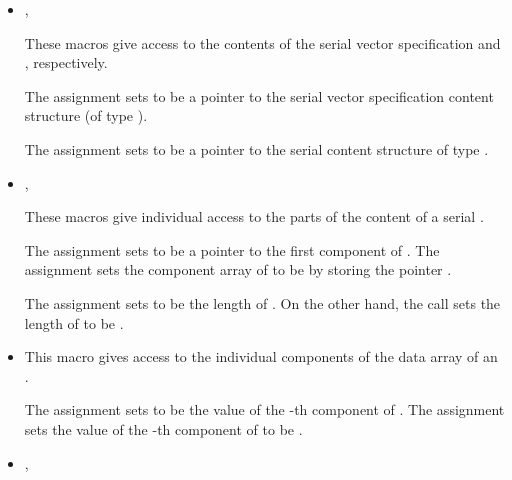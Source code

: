 \begin{itemize}

\item {}, 

      These macros give access to the contents of the serial 
      vector specification and , respectively.           
                                                               
      The assignment  sets       
       to be a pointer to the serial vector
      specification content structure (of type ).

      The assignment  sets       
       to be a pointer to the serial  content    
      structure of type .

\item {}, 

      These macros give individual access to the parts of    
      the content of a serial .                        
                                                               
      The assignment  sets  to be     
      a pointer to the first component of . The assignment    
       sets the component array of  to     
      be  by storing the pointer .                   
                                                               
      The assignment  sets  to be     
      the length of . On the other hand, the call  
      sets the length of  to be .

\item {}

      This macro gives access to the individual components of the data
      array of an .

      The assignment  sets  to be the value of 
      the -th component of . The assignment    
      sets the value of the -th component of  to be .        

\item {}, 


\end{itemize}
